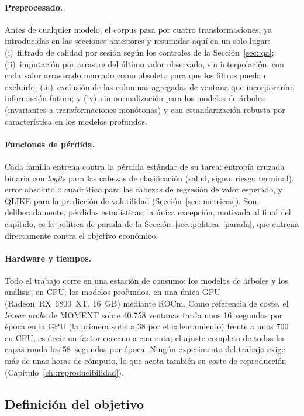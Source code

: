 \paragraph{Preprocesado.} Antes de cualquier modelo, el corpus pasa por cuatro
transformaciones, ya introducidas en las secciones anteriores y resumidas aquí en un solo
lugar: (i)~filtrado de calidad por sesión según los
controles de la Sección~\ref{sec::qa}; (ii)~imputación por arrastre del último valor
observado, sin interpolación, con cada valor arrastrado marcado como obsoleto para que los
filtros puedan excluirlo; (iii)~exclusión de las columnas agregadas de ventana que
incorporarían información futura; y (iv)~sin normalización para los modelos de árboles
(invariantes a transformaciones monótonas) y con estandarización robusta por característica
en los modelos profundos.

\paragraph{Funciones de pérdida.} Cada familia entrena contra la pérdida estándar de su
tarea: entropía cruzada binaria con \emph{logits} para las cabezas de clasificación (salud,
signo, riesgo terminal), error absoluto o cuadrático para las cabezas de regresión de valor
esperado, y QLIKE para la predicción de volatilidad (Sección~\ref{sec::metricas}). Son,
deliberadamente, pérdidas estadísticas; la única excepción, motivada al final del capítulo,
es la política de parada de la Sección~\ref{sec::politica_parada}, que entrena directamente
contra el objetivo económico.

\paragraph{Hardware y tiempos.} Todo el trabajo corre en una estación de consumo: los
modelos de árboles y los análisis, en CPU; los modelos profundos, en una única GPU
(Radeon~RX~6800~XT, 16~GB) mediante ROCm. Como referencia de coste, el \emph{linear probe}
de MOMENT sobre 40.758 ventanas tarda unos 16~segundos por época en la GPU (la primera
sube a 38 por el calentamiento) frente a unos 700 en CPU, es decir un factor cercano a
cuarenta; el ajuste completo de todas las capas ronda los 58~segundos por época. Ningún
experimento del trabajo exige más de unas horas de cómputo, lo que acota también su coste
de reproducción (Capítulo~\ref{ch::reproducibilidad}).

\subsection{Definición del objetivo}

